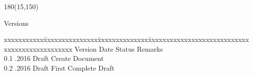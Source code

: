 
\begin{textblock}{180}(15,150)
\color{black}
\begin{huge}
Versions
\end{huge}
\vspace{10mm}

\fontsize{10pt}{18pt}\selectfont
\begin{tabbing}
xxxxxxxxxxx\=xxxxxxxxxxxxxxx\=xxxxxxxxxxxxxx\=xxxxxxxxxxxxxxxxxxxxxxxxxxxxxxxxxxxxxxxxxxxxxxx \kill
Version	\> Date	\> Status			\> Remarks		\\
0.1	.2016	\> Draft		\> Create Document	\\	
0.2	.2016	\> Draft		\> First Complete Draft	\\ 	
\end{tabbing}

\end{textblock}
